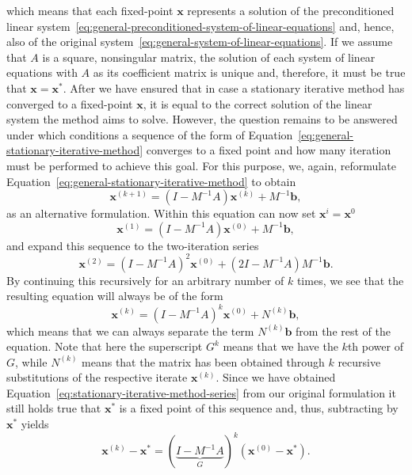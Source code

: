 which means that each fixed-point $\bm{x}$ represents a solution of the preconditioned linear system~\eqref{eq:general-preconditioned-system-of-linear-equations} and, hence, also of the original system~\eqref{eq:general-system-of-linear-equations}.
If we assume that $A$ is a square, nonsingular matrix, the solution of each system of linear equations with $A$ as its coefficient matrix is unique and, therefore, it must be true that $\bm{x} = \bm{x}^{*}$.
After we have ensured that in case a stationary iterative method has converged to a fixed-point $\bm{x}$, it is equal to the correct solution of the linear system the method aims to solve.
However, the question remains to be answered under which conditions a sequence of the form of Equation~\eqref{eq:general-stationary-iterative-method} converges to a fixed point and how many iteration must be performed to achieve this goal.
For this purpose, we, again, reformulate Equation~\eqref{eq:general-stationary-iterative-method} to obtain
\begin{equation}
	\bm{x}^{(k+1)} = (I - M^{-1} A) \bm{x}^{(k)} + M^{-1}\bm b,
\end{equation}
as an alternative formulation.
Within this equation can now set $\bm{x}^{i} = \bm{x}^{0}$ 
\begin{equation}
	\bm{x}^{(1)} = (I - M^{-1} A) \bm{x}^{(0)} + M^{-1}\bm b,
\end{equation}
and expand this sequence to the two-iteration series
\begin{equation}
	\bm{x}^{(2)} = (I - M^{-1} A)^2 \bm{x}^{(0)} + (2I - M^{-1} A)M^{-1} \bm{b}.
\end{equation}
By continuing this recursively for an arbitrary number of $k$ times, we see that the resulting equation will always be of the form
\begin{equation}
	\bm{x}^{(k)} = (I - M^{-1} A)^k \bm{x}^{(0)} + N^{(k)}\bm{b},
	\label{eq:stationary-iterative-method-series}
\end{equation}
which means that we can always separate the term $N^{(k)}\bm{b}$ from the rest of the equation.
Note that here the superscript $G^k$ means that we have the $k$th power of $G$, while $N^{(k)}$ means that the matrix has been obtained through $k$ recursive substitutions of the respective iterate $\bm{x}^{(k)}$.
Since we have obtained Equation~\eqref{eq:stationary-iterative-method-series} from our original formulation it still holds true that $\bm{x}^{*}$ is a fixed point of this sequence and, thus, subtracting by $\bm{x}^{*}$ yields
\begin{equation}
	\bm{x}^{(k)} - \bm{x}^{*} = (\underbrace{I - M^{-1} A}_{G})^k (\bm{x}^{(0)} - \bm{x}^{*}).
	\label{eq:iteration-matrix-sequence}
\end{equation}
